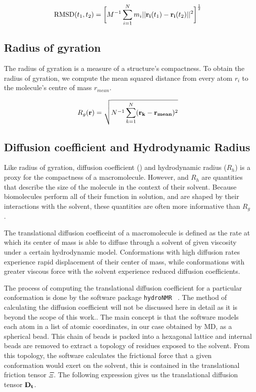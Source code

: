 \begin{equation}
\text{RMSD}(t_1, t_2) = \bigg[ M^{-1} \sum_{i=1}^{N} m_{i} \lvert \lvert \mathbf{r_{i}}(t_{1}) - \mathbf{r_{i}}(t_{2}) \rvert \rvert^2 \bigg]^\frac{1}{2}
\end{equation}


\subsection{Radius of gyration}

The radius of gyration is a measure of a structure's compactness. To obtain the radius of gyration, we compute the mean squared distance from every atom $r_i$ to the molecule's centre of mass $r_{mean}$.

\begin{equation}
R_g(\mathbf{r}) = \sqrt{N^{-1} \sum_{k=1}^{N} (\mathbf{r_k} - \mathbf{r_{mean}})^2}
\end{equation}

\subsection{Diffusion coefficient and Hydrodynamic Radius}

Like radius of gyration, diffusion coefficient (\diffusion) and hydrodynamic radius ($R_h$) is a proxy for the compactness of a macromolecule. However, \diffusion and $R_h$ are quantities that describe the size of the molecule in the context of their solvent. Because biomolecules perform all of their function in solution, and are shaped by their interactions with the solvent, these quantities are often more informative than $R_g$.

The translational diffusion coefficeint of a macromolecule is defined as the rate at which its center of mass is able to diffuse through a solvent of given viscosity under a certain hydrodynamic model. Conformations with high diffusion rates experience rapid displacement of their center of mass, while conformations with greater viscous force with the solvent experience reduced diffusion coefficients. 

The process of computing the translational diffusion coefficient for a particular conformation is done by the software package \texttt{hydroNMR} ~\cite{de2000hydronmr}. The method of calculating the diffusion coefficient will not be discussed here in detail as it is beyond the scope of this work.. The main concept is that the software models each atom in a list of atomic coordinates, in our case obtained by MD, as a spherical bead. This chain of beads is packed into a hexagonal lattice and internal beads are removed to extract a topology of residues exposed to the solvent. From this topology, the software calculates the frictional force that a given conformation would exert on the solvent, this is contained in the translational friction tensor $\Xi$. The following expression gives us the translational diffusion tensor $\mathbf{D_t}$.

